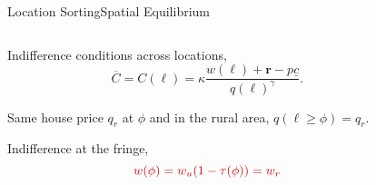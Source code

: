 \documentclass[aspectratio=169]{beamer}
\begin{document}
\begin{v75mins}
\begin{frame}{Location Sorting}{Spatial Equilibrium}

\begin{columns}
\begin{column}{0.5\textwidth}

\begin{midi}
 \item  Indifference conditions across locations,
\begin{equation*}
 \overline{C}=C(\ell)=\kappa\frac{w(\ell)+\mathbf{r}-p\underline{c}}{q(\ell)^{\gamma}}.
\end{equation*}
\item Same house price $q_r$ at $\phi$ and in the rural area, $q(\ell \geq \phi)=q_r$.
\item Indifference at the fringe,
\begin{equation*}
\re{w(\phi)=w_u(1-\tau(\phi))=w_r}
\end{equation*}
\end{midi} 
\end{column}		
\begin{column}{0.5\textwidth}
		
\end{column}
\end{columns}
\pause


\end{frame}



\end{v75mins}
\end{document}
